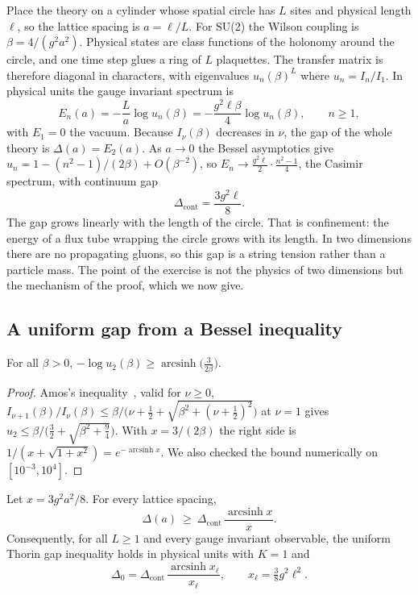 Place the theory on a cylinder whose spatial circle has $L$ sites and physical length $\ell$, so the lattice spacing is $a=\ell/L$. For SU(2) the Wilson coupling is $\beta=4/(g^2a^2)$. Physical states are class functions of the holonomy around the circle, and one time step glues a ring of $L$ plaquettes. The transfer matrix is therefore diagonal in characters, with eigenvalues $u_n(\beta)^L$ where $u_n=I_n/I_1$. In physical units the gauge invariant spectrum is
\[
E_n(a)=-\frac{L}{a}\log u_n(\beta)=-\frac{g^2\ell\beta}{4}\log u_n(\beta),\qquad n\ge1,
\]
with $E_1=0$ the vacuum. Because $I_\nu(\beta)$ decreases in $\nu$, the gap of the whole theory is $\Delta(a)=E_2(a)$. As $a\to0$ the Bessel asymptotics give $u_n=1-(n^2-1)/(2\beta)+O(\beta^{-2})$, so $E_n\to\frac{g^2\ell}{2}\cdot\frac{n^2-1}{4}$, the Casimir spectrum, with continuum gap
\[
\Delta_{\mathrm{cont}}=\frac{3g^2\ell}{8}.
\]
The gap grows linearly with the length of the circle. That is confinement: the energy of a flux tube wrapping the circle grows with its length. In two dimensions there are no propagating gluons, so this gap is a string tension rather than a particle mass. The point of the exercise is not the physics of two dimensions but the mechanism of the proof, which we now give.

\subsection{A uniform gap from a Bessel inequality}

\begin{lemma}\label{lem:amosB}
For all $\beta>0$, $-\log u_2(\beta)\ge\operatorname{arcsinh}\big(\tfrac{3}{2\beta}\big)$.
\end{lemma}

\begin{proof}
Amos's inequality~\cite{Am74}, valid for $\nu\ge0$, $I_{\nu+1}(\beta)/I_\nu(\beta)\le\beta/\big(\nu+\frac12+\sqrt{\beta^2+(\nu+\frac12)^2}\big)$ at $\nu=1$ gives $u_2\le\beta/\big(\frac32+\sqrt{\beta^2+\frac94}\big)$. With $x=3/(2\beta)$ the right side is $1/(x+\sqrt{1+x^2})=e^{-\operatorname{arcsinh}x}$. We also checked the bound numerically on $[10^{-3},10^4]$.
\end{proof}

\begin{theorem}\label{thm:2dB}
Let $x=3g^2a^2/8$. For every lattice spacing,
\[
\Delta(a)\ \ge\ \Delta_{\mathrm{cont}}\,\frac{\operatorname{arcsinh}x}{x}.
\]
Consequently, for all $L\ge1$ and every gauge invariant observable, the uniform Thorin gap inequality holds in physical units with $K=1$ and
\[
\Delta_0=\Delta_{\mathrm{cont}}\,\frac{\operatorname{arcsinh}x_\ell}{x_\ell},\qquad x_\ell=\tfrac38g^2\ell^2 .
\]
\end{theorem}


